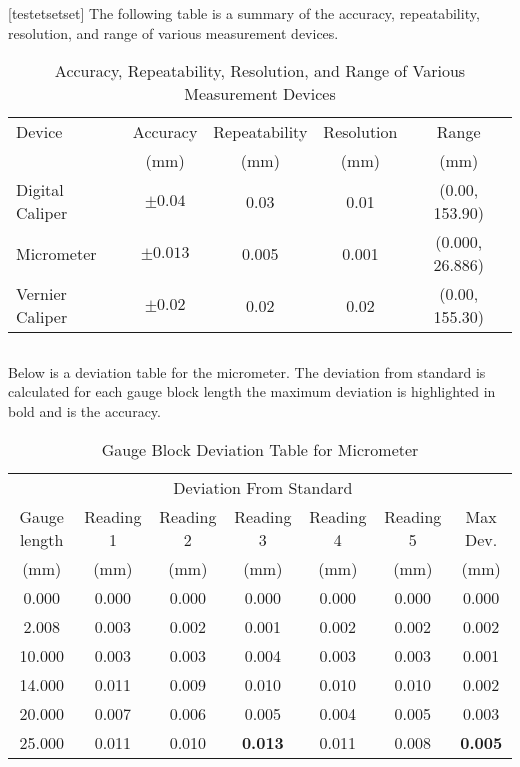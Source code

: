 \section{}
\subsection{}[testetsetset]
The following table is a summary of the accuracy, repeatability, resolution, and range of various measurement devices.
\begin{table}[h]
    \caption{Accuracy, Repeatability, Resolution, and Range of Various Measurement Devices}
    \label{tab:measurement-devices}
    \centering
    \begin{tabular}{lcccc}
        \toprule
        Device & Accuracy & Repeatability & Resolution & Range \\
        & (mm) & (mm) & (mm) & (mm) \\
        \midrule
        Digital Caliper & $\pm 0.04$ & 0.03 & 0.01 & (0.00, 153.90) \\
        Micrometer & $\pm 0.013$ & 0.005 & 0.001 & (0.000, 26.886) \\
        Vernier Caliper & $\pm 0.02$ & 0.02 & 0.02 & (0.00, 155.30) \\
        \bottomrule
    \end{tabular}
\end{table}

\subsection{}
Below is a deviation table for the micrometer. The deviation from standard is calculated for each gauge block length the maximum deviation is highlighted in bold and is the accuracy. \\

\begin{table}[h]
    \caption{Gauge Block Deviation Table for Micrometer}
    \label{tab:gauge-block-deviation-table-micrometer}
    \centering
    \begin{tabular}{ccccccc}
        \toprule
        & \multicolumn{5}{c}{Deviation From Standard} & \\
        Gauge length & Reading 1 & Reading 2 & Reading 3 & Reading 4 & Reading 5 & Max Dev. \\
        (mm) & (mm) & (mm) & (mm) & (mm) & (mm) & (mm) \\
        \midrule
        0.000 & 0.000 & 0.000 & 0.000 & 0.000 & 0.000 & 0.000 \\
        2.008 & 0.003 & 0.002 & 0.001 & 0.002 & 0.002 & 0.002 \\
        10.000 & 0.003 & 0.003 & 0.004 & 0.003 & 0.003 & 0.001 \\
        14.000 & 0.011 & 0.009 & 0.010 & 0.010 & 0.010 & 0.002 \\
        20.000 & 0.007 & 0.006 & 0.005 & 0.004 & 0.005 & 0.003 \\
        25.000 & 0.011 & 0.010 & \textbf{0.013} & 0.011 & 0.008 & \textbf{0.005} \\
        \bottomrule
    \end{tabular}
\end{table}

